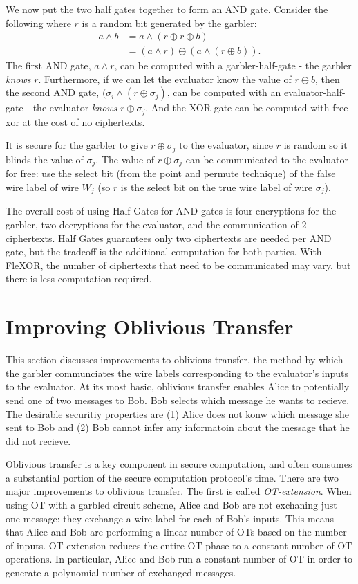 We now put the two half gates together to form an AND gate. 
Consider the following where $r$ is a random bit generated by the garbler:
\begin{align}
    a \wedge b & = a \wedge (r \oplus r \oplus b) \\
               & = (a \wedge r) \oplus (a \wedge (r \oplus b)).
\end{align}
The first AND gate, $a \wedge r$, can be computed with a garbler-half-gate - the garbler \textit{knows} $r$. 
Furthermore, if we can let the evaluator know the value of $r \oplus b$, then the second AND gate, $(\sigma_i \wedge (r \oplus \sigma_j)$, can be computed with an evaluator-half-gate - the evaluator \textit{knows} $r \oplus \sigma_j$. 
And the XOR gate can be computed with free xor at the cost of no ciphertexts. 

It is secure for the garbler to give $r \oplus \sigma_j$ to the evaluator, since $r$ is random so it blinds the value of $\sigma_j$. 
The value of $r \oplus \sigma_j$ can be communicated to the evaluator for free: use the select bit (from the point and permute technique) of the false wire label of wire $W_j$ (so $r$ is the select bit on the true wire label of wire $\sigma_j$).

The overall cost of using Half Gates for AND gates is four encryptions for the garbler, two decryptions for the evaluator, and the communication of $2$ ciphertexts. 
Half Gates guarantees only two ciphertexts are needed per AND gate, but the tradeoff is the additional computation for both parties.
With FleXOR, the number of ciphertexts that need to be communicated may vary, but there is less computation required.

\section{Improving Oblivious Transfer}
This section discusses improvements to oblivious transfer, the method by which the garbler communciates the wire labels corresponding to the evaluator's inputs to the evaluator.
At its most basic, oblivious transfer enables Alice to potentially send one of two messages to Bob.
Bob selects which message he wants to recieve.
The desirable securitiy properties are (1) Alice does not konw which message she sent to Bob and (2) Bob cannot infer any informatoin about the message that he did not recieve.

Oblivious transfer is a key component in secure computation, and often consumes a substantial portion of the secure computation protocol's time.
There are two major improvements to oblivious transfer.
The first is called \textit{OT-extension}.
When using OT with a garbled circuit scheme, Alice and Bob are not exchaning just one message: they exchange a wire label for each of Bob's inputs.
This means that Alice and Bob are performing a linear number of OTs based on the number of inputs.
OT-extension reduces the entire OT phase to a constant number of OT operations.
In particular, Alice and Bob run a constant number of OT in order to generate a polynomial number of exchanged messages.

